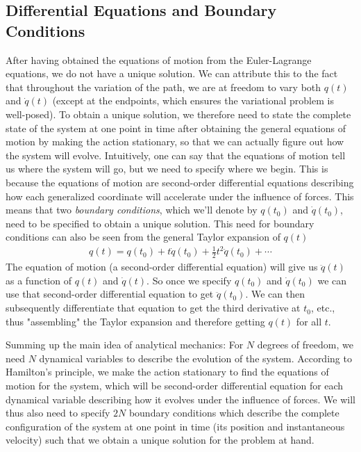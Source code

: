 \documentclass[a4paper]{article}
\begin{document}
    \subsection{Differential Equations and Boundary Conditions}
    After having obtained the equations of motion from the Euler-Lagrange equations, we do not have a unique solution. We can attribute this to the fact that throughout the variation of the path, we are at freedom to vary both \(q(t)\) and \(\dot{q} (t)\) (except at the endpoints, which ensures the variational problem is well-posed). To obtain a unique solution, we therefore need to state the complete state of the system at one point in time after obtaining the general equations of motion by making the action stationary, so that we can actually figure out how the system will evolve. Intuitively, one can say that the equations of motion tell us where the system will go, but we need to specify where we begin. This is because the equations of motion are second-order differential equations describing how each generalized coordinate will accelerate under the influence of forces. This means that two \textit{boundary conditions}, which we'll denote by \(q(t_0)\) and \(\dot{q}(t_0)\), need to be specified to obtain a unique solution. This need for boundary conditions can also be seen from the general Taylor expansion of \(q(t)\) \begin{align*}
        q(t) = q(t_0) + t\dot{q}(t_0) + \frac{1}{2} t^{2} \ddot{q}(t_0) + \cdots 
    \end{align*} 
    The equation of motion (a second-order differential equation) will give us \(\ddot{q}(t)\) as a function of \(q(t)\) and \(\dot{q}(t)\). So once we specify \(q(t_0)\) and \(\dot{q} (t_0)\) we can use that second-order differential equation to get \(\ddot{q}(t_0)\). We can then subsequently differentiate that equation to get the third derivative at \(t_0\), etc., thus "assembling" the Taylor expansion and therefore getting \(q(t)\) for all \(t\).
    
    Summing up the main idea of analytical mechanics: For \(N\) degrees of freedom, we need \(N\) dynamical variables to describe the evolution of the system. According to Hamilton's principle, we make the action stationary to find the equations of motion for the system, which will be second-order differential equation for each dynamical variable describing how it evolves under the influence of forces. We will thus also need to specify \(2N\) boundary conditions which describe the complete configuration of the system at one point in time (its position and instantaneous velocity) such that we obtain a unique solution for the problem at hand. 
\end{document}
